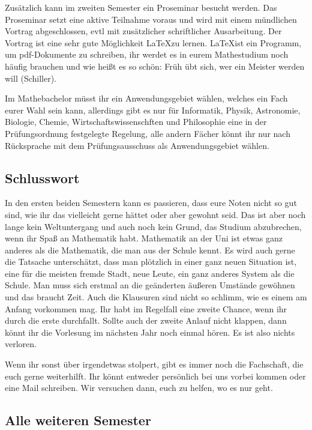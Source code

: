 Zusätzlich kann im zweiten Semester ein Proseminar besucht werden. Das
Proseminar setzt eine aktive Teilnahme voraus und wird mit einem mündlichen
Vortrag abgeschlossen, evtl mit zusätzlicher schriftlicher Ausarbeitung.  Der
Vortrag ist eine sehr gute Möglichkeit \LaTeX zu lernen.  \LaTeX ist ein
Programm, um pdf-Dokumente zu schreiben, ihr werdet es in eurem Mathestudium
noch häufig brauchen und wie heißt es so schön: Früh übt sich, wer ein Meister
werden will (Schiller).


Im Mathebachelor müsst ihr ein Anwendungsgebiet wählen, welches ein Fach eurer
Wahl sein kann, allerdings gibt es nur für Informatik, Physik, Astronomie,
Biologie, Chemie, Wirtschaftswissenschften und Philosophie eine in der
Prüfungsordnung festgelegte Regelung, alle andern Fächer könnt ihr nur nach
Rücksprache mit dem Prüfungsausschuss als Anwendungsgebiet wählen.

\subsection{Schlusswort}

In den ersten beiden Semestern kann es passieren, dass eure Noten nicht so gut
sind, wie ihr das vielleicht gerne hättet oder aber gewohnt seid.  Das ist aber
noch lange kein Weltuntergang und auch noch kein Grund, das Studium
abzubrechen, wenn ihr Spaß an Mathematik habt. Mathematik an der Uni ist etwas
ganz anderes als die Mathematik, die man aus der Schule kennt.  Es wird auch
gerne die Tatsache unterschätzt, dass man plötzlich in einer ganz neuen
Situation ist, eine für die meisten fremde Stadt, neue Leute, ein ganz anderes
System als die Schule.  Man muss sich erstmal an die geänderten äußeren
Umstände gewöhnen und das braucht Zeit.  Auch die Klausuren sind nicht so
schlimm, wie es einem am Anfang vorkommen mag.  Ihr habt im Regelfall eine
zweite Chance, wenn ihr durch die erste durchfallt.  Sollte auch der zweite
Anlauf nicht klappen, dann könnt ihr die Vorlesung im nächsten Jahr noch einmal
hören. Es ist also nichts verloren.

Wenn ihr sonst über irgendetwas stolpert, gibt es immer noch die Fachschaft,
die euch gerne weiterhilft. Ihr könnt entweder persönlich bei uns vorbei kommen
oder eine Mail schreiben. Wir versuchen dann, euch zu helfen, wo es nur geht.


\subsection{Alle weiteren Semester}

